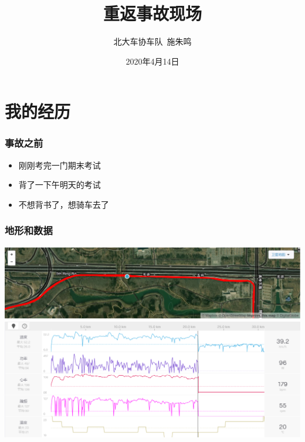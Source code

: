 \documentclass[12pt,AutoFakeBold]{beamer}
\title{重返事故现场}
\author{北大车协车队\ 施朱鸣}
\date{2020年4月14日}
\begin{document}
    {
    \begin{frame}
    \end{frame}
    }

    \frame[plain]{\titlepage}


    \section{我的经历}

    \begin{frame}
        \frametitle{事故之前}
    
        \begin{itemize}
            \item 刚刚考完一门期末考试
            \item 背了一下午明天的考试
            \item 不想背书了，想骑车去了
        \end{itemize}
    
    \end{frame}

    \begin{frame}
        \frametitle{地形和数据}
        \begin{center}
            \includegraphics[width=0.8\paperwidth]{figures/map.png}
            \includegraphics[width=0.8\paperwidth]{figures/table.png}
        \end{center}
    \end{frame}
\end{document}
